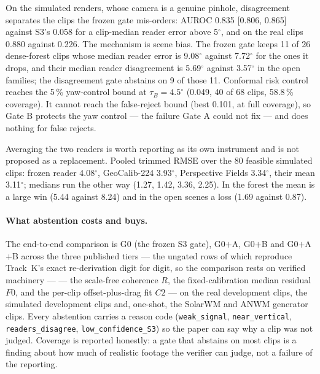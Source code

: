 On the simulated renders, whose camera is a genuine pinhole, disagreement separates the clips
the frozen gate mis-orders: AUROC 0.835 [0.806, 0.865] against S3's 0.058 for a clip-median
reader error above 5$^\circ$, and on the real clips 0.880 against 0.226. The mechanism is
scene bias. The frozen gate keeps 11 of 26 dense-forest clips whose median reader error is
9.08$^\circ$ against 7.72$^\circ$ for the ones it drops, and their median reader disagreement
is 5.69$^\circ$ against 3.57$^\circ$ in the open families; the disagreement gate abstains on
9 of those 11. Conformal risk control reaches the 5\,\% yaw-control bound at
$\tau_B=4.5^\circ$ (0.049, 40 of 68 clips, 58.8\,\% coverage). It cannot reach the
false-reject bound (best 0.101, at full coverage), so Gate B protects the yaw control --- the
failure Gate A could not fix --- and does nothing for false rejects.

Averaging the two readers is worth reporting as its own instrument and is not proposed as a
replacement. Pooled trimmed RMSE over the 80 feasible simulated clips: frozen reader
4.08$^\circ$, GeoCalib-224 3.93$^\circ$, Perspective Fields 3.34$^\circ$, their mean
3.11$^\circ$; medians run the other way (1.27, 1.42, 3.36, 2.25). In the forest the mean is a
large win (5.44 against 8.24) and in the open scenes a loss (1.69 against 0.87).

\paragraph{What abstention costs and buys.}
The end-to-end comparison is G0 (the frozen S3 gate), G0$+$A, G0$+$B and G0$+$A$+$B across the
three published tiers --- the ungated rows of which reproduce Track~K's exact re-derivation
digit for digit, so the comparison rests on verified machinery --- --- the scale-free coherence $R$, the fixed-calibration median residual
$F0$, and the per-clip offset-plus-drag fit $C2$ --- on the real development clips, the
simulated development clips and, one-shot, the SolarWM and ANWM generator clips. Every
abstention carries a reason code (\texttt{weak\_signal}, \texttt{near\_vertical},
\texttt{readers\_disagree}, \texttt{low\_confidence\_S3}) so the paper can say why a clip was
not judged. Coverage is reported honestly: a gate that abstains on most clips is a finding
about how much of realistic footage the verifier can judge, not a failure of the reporting.
